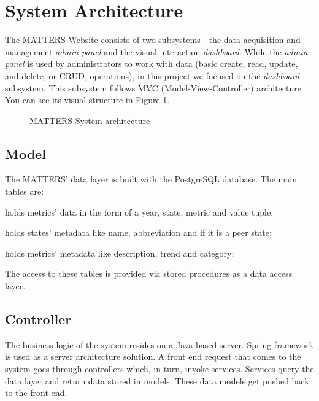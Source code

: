 	\section{System Architecture}
	
		The MATTERS Website consists of two subsystems - the data acquisition and management \emph{admin panel} and the visual-interaction \emph{dashboard}.
		While the \emph{admin panel} is used by administrators to work with data 
		(basic create, read, update, and delete, or CRUD, operations), in this project we focused on the \emph{dashboard} subsystem.
		This subsystem follows MVC (Model-View-Controller) architecture. You can see its visual 
		structure in Figure \ref{fig:sysarch}.
		
		\begin{figure}[t]
			\centering
			
			\caption{MATTERS System architecture}
			\label{fig:sysarch}
		\end{figure}
		
		
		\subsection{Model}
			
			The MATTERS' data layer is built with the PostgreSQL database. The main tables are:
			
			\begin{description}[itemsep=-1.5mm, align=right,labelwidth=3cm]
				\item [Statistics]
					holds metrics' data in the form of a year, state, metric and value tuple;
				\item [States]
					holds states' metadata like name, abbreviation and if it is a peer state;
				\item [Metrics]
					holds metrics' metadata like description, trend and category;							
			\end{description}
			
			The access to these tables is provided via stored procedures as a data access layer.
			
		\subsection{Controller}
		
			The business logic of the system resides on a Java-based server. Spring framework is 
			used as a server architecture solution. A front end request that comes to the system goes 
			through controllers which, in turn, invoke services. Services query the data layer and return 
			data stored	in models. These data models get pushed back to the front end.
			
